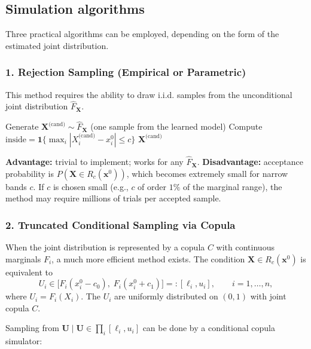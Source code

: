 \subsection{Simulation algorithms}

Three practical algorithms can be employed, depending on the form of the estimated joint distribution.

\subsubsection*{1. Rejection Sampling (Empirical or Parametric)}

This method requires the ability to draw i.i.d. samples from the unconditional joint distribution $\hat{F}_{\mathbf{X}}$.

\begin{algorithm}[H]
\caption{Rejection sampling inside $R_c(\mathbf{x}^0)$}
\begin{algorithmic}[1]
\Repeat
    \State Generate $\mathbf{X}^{\text{(cand)}} \sim \hat{F}_{\mathbf{X}}$ (one sample from the learned model)
    \State Compute $\displaystyle \text{inside} = \mathbf{1}\bigl\{ \max_i |X_i^{\text{(cand)}} - x_i^0| \le c \bigr\}$
\State \Return $\mathbf{X}^{\text{(cand)}}$
\end{algorithmic}
\end{algorithm}

\textbf{Advantage:} trivial to implement; works for any $\hat{F}_{\mathbf{X}}$.
\textbf{Disadvantage:} acceptance probability is $P(\mathbf{X} \in R_c(\mathbf{x}^0))$, which becomes extremely small for narrow bands $c$. If $c$ is chosen small (e.g., $c$ of order $1\%$ of the marginal range), the method may require millions of trials per accepted sample.

\subsubsection*{2. Truncated Conditional Sampling via Copula}

When the joint distribution is represented by a copula $C$ with continuous marginals $F_i$, a much more efficient method exists. The condition $\mathbf{X} \in R_c(\mathbf{x}^0)$ is equivalent to
\[
U_i \in \bigl[ F_i(x_i^0 - c_0),\; F_i(x_i^0 + c_1) \bigr] =: [\ell_i, u_i],\qquad i=1,\dots,n,
\]
where $U_i = F_i(X_i)$. The $U_i$ are uniformly distributed on $(0,1)$ with joint copula $C$.

Sampling from $\mathbf{U} \mid \mathbf{U} \in \prod_i [\ell_i, u_i]$ can be done by a conditional copula simulator:

